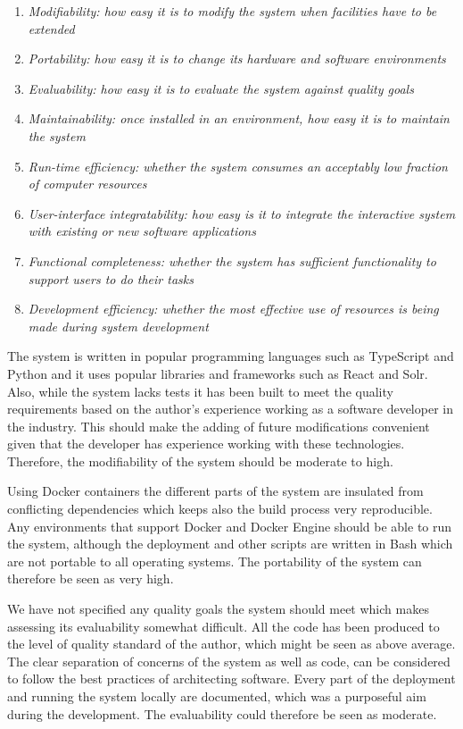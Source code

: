 \begin{enumerate}
    \item \textit{Modifiability: how easy it is to modify the system when facilities have to be extended}
    \item \textit{Portability: how easy it is to change its hardware and software environments}
    \item \textit{Evaluability: how easy it is to evaluate the system against quality goals}
    \item \textit{Maintainability: once installed in an environment, how easy it is to maintain the system}
    \item \textit{Run-time efficiency: whether the system consumes an acceptably low fraction of computer resources}
    \item \textit{User-interface integratability: how easy is it to integrate the interactive system with existing or new software applications}
    \item \textit{Functional completeness: whether the system has sufficient functionality to support users to do their tasks}
    \item \textit{Development efficiency: whether the most effective use of resources is being made during system development}
\end{enumerate}

The system is written in popular programming languages such as TypeScript and Python and it uses popular libraries and frameworks such as React and Solr. Also, while the system lacks tests it has been built to meet the quality requirements based on the author's experience working as a software developer in the industry. This should make the adding of future modifications convenient given that the developer has experience working with these technologies. Therefore, the modifiability of the system should be moderate to high.

Using Docker containers the different parts of the system are insulated from conflicting dependencies which keeps also the build process very reproducible. Any environments that support Docker and Docker Engine should be able to run the system, although the deployment and other scripts are written in Bash which are not portable to all operating systems. The portability of the system can therefore be seen as very high.

We have not specified any quality goals the system should meet which makes assessing its evaluability somewhat difficult. All the code has been produced to the level of quality standard of the author, which might be seen as above average. The clear separation of concerns of the system as well as code, can be considered to follow the best practices of architecting software. Every part of the deployment and running the system locally are documented, which was a purposeful aim during the development. The evaluability could therefore be seen as moderate.

